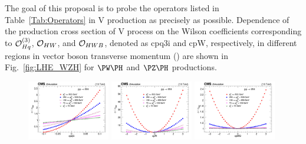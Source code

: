 \documentclass[a4paper,11pt]{article}
\renewcommand{\PV}{{{{V}}}\xspace}
\newcommand{\VH}{{{\PV}{\PH}}\xspace}
\begin{document}
The goal of this proposal is to probe the operators listed in Table~\ref{Tab:Operators} in \VH production as precisely as possible.
Dependence of the production cross section of \VH process on the Wilson coefficients corresponding to ${\cal O}^{(3)}_{Hq}$, ${\cal O}_{HW}$, and ${\cal O}_{HWB}$, denoted as cpq3i and cpW, respectively, in different regions in vector boson transverse momentum (\pt) are shown in Fig.~\ref{fig:LHE_WZH} for $\PW\PH$ and $\PZ\PH$ productions. 
\begin{figure}[hbtp]
\begin{center}
\includegraphics[width=0.321\textwidth]{Figures/LHE/WH/Canv_cpq3i.png}
\includegraphics[width=0.321\textwidth]{Figures/LHE/WH/Canv_cpW.png}
\includegraphics[width=0.321\textwidth]{Figures/LHE/WH/Canv_cpWB.png}


\end{center}
\end{figure}
\end{document}
